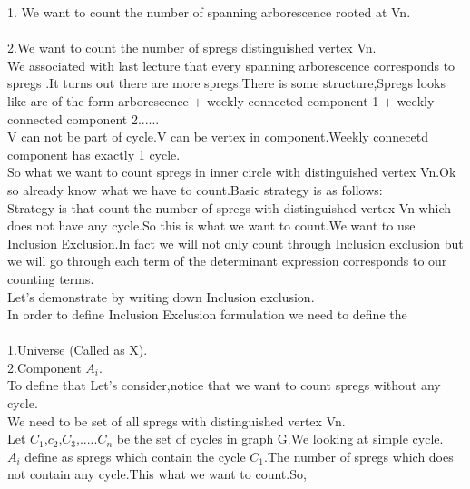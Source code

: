 1. We want to count the number of spanning arborescence rooted at Vn.\\ \\
2.We want to count the number of spregs distinguished vertex Vn.\\
We associated with last lecture that every spanning arborescence corresponds to spregs .It turns out there are more spregs.There is some structure,Spregs looks like are of the form arborescence $+$ weekly connected component 1 $+$ weekly connected component 2......\\
V can not be part of cycle.V can be vertex in component.Weekly connecetd component has exactly 1 cycle.\\
So what we want to count spregs in inner circle with distinguished vertex Vn.Ok so already know what we have to count.Basic strategy is as follows:\\
Strategy is that count the number of spregs with distinguished vertex Vn which does not have any cycle.So this is what we want to count.We want to use Inclusion Exclusion.In fact we will not only count through Inclusion exclusion but we will go through each term of the determinant expression corresponds to our counting terms.\\
Let's demonstrate by writing down Inclusion exclusion.\\
In order to define Inclusion Exclusion formulation we need to define the \\ \\
1.Universe (Called as X).\\
2.Component $A_i$.\\
To define that Let's consider,notice that we want to count spregs without any cycle.\\
We need to be set of all spregs with distinguished vertex Vn.\\
Let $C_1$,$c_2$,$C_3$,.....$C_n$ be the set of cycles in graph G.We looking at simple cycle.\\
$A_i$ define as spregs which contain the cycle $C_1$.The number of spregs which does not contain any cycle.This what we want to count.So,\\

